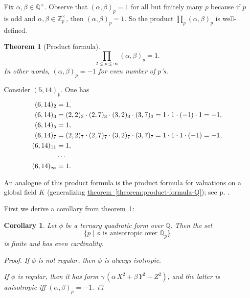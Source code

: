 \documentclass{article}
\newcommand{\ZZ}{\mathbb{Z}}
\newcommand{\QQ}{\mathbb{Q}}
\newcommand{\refref}[2]{\hyperref[#2]{#1~\ref*{#2}}}
\newcommand{\examplesymbol}{$\blacktriangle$}
\renewcommand{\qedsymbol}{$\blacksquare$}
\theoremstyle{myplain}
\newtheorem{theorem}[proposition]{Theorem}
\newtheorem{corollary}[proposition]{Corollary}
\theoremstyle{mydefinition}
\newenvironment{example}
  {\pushQED{\qed}\renewcommand{\qedsymbol}{\examplesymbol}\examplex}
  {\popQED\endexamplex}
\begin{document}
Fix $\alpha,\beta \in \QQ^\times$. Observe that $(\alpha,\beta)_p = 1$ for all
but finitely many $p$ because if $p$ is odd and $\alpha,\beta \in \ZZ_p^\times$,
then $(\alpha,\beta)_p = 1$. So the product $\prod_p (\alpha,\beta)_p$ is
well-defined.

\begin{theorem}[Product formula]\label{theorem:hilbert-prod-formula}
  \[ \prod_{2 \le p \le \infty} (\alpha,\beta)_p = 1. \]
  In other words, $(\alpha,\beta)_p = -1$ for even number of $p$'s.
\end{theorem}

\begin{example}
  Consider $(5,14)_p$. One has
  \begin{align*}
    (6,14)_2 & = 1,\\
    (6,14)_3 & = (2,2)_3 \cdot (2,7)_3 \cdot (3,2)_3 \cdot (3,7)_3 = 1\cdot 1\cdot (-1)\cdot 1 = -1,\\
    (6,14)_5 & = 1,\\
    (6,14)_7 & = (2,2)_7 \cdot (2,7)_7 \cdot (3,2)_7 \cdot (3,7)_7 = 1\cdot 1\cdot 1\cdot (-1) = -1,\\
    (6,14)_{11} & = 1,\\
             & \cdots \\
    (6,14)_\infty & = 1. \qedhere
  \end{align*}
\end{example}

An analogue of this product formula is the product formula for valuations on a
global field $K$ (generalizing \refref{theorem}{theorem:product-formula-Q});
see p. \pageref{product-formula-K}.

First we derive a corollary from \refref{theorem}{theorem:hilbert-prod-formula}:

\begin{corollary}\label{corollary:even-num-of-p-such-that-isotropic}
  Let $\phi$ be a ternary quadratic form over $\QQ$. Then the set
  $$\{ p \mid \phi \text{ is anisotropic over } \QQ_p \}$$
  is finite and has even cardinality.

  \begin{proof}
    If $\phi$ is not regular, then $\phi$ is always isotropic.

    If $\phi$ is regular, then it has form
    $\gamma \, (\alpha\,X^2 + \beta\,Y^2 - Z^2)$, and the latter is anisotropic
    iff $(\alpha,\beta)_p = -1$.
  \end{proof}
\end{corollary}
\end{document}
